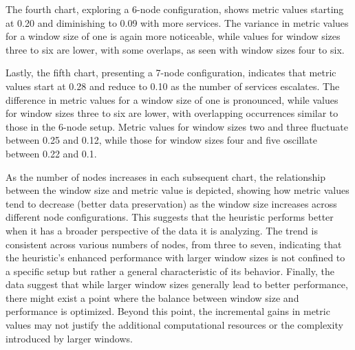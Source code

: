 The fourth chart, exploring a 6-node configuration, shows metric values starting at 0.20 and diminishing to 0.09 with more services. The variance in metric values for a window size of one is again more noticeable, while values for window sizes three to six are lower, with some overlaps, as seen with window sizes four to six.

Lastly, the fifth chart, presenting a 7-node configuration, indicates that metric values start at 0.28 and reduce to 0.10 as the number of services escalates. The difference in metric values for a window size of one is pronounced, while values for window sizes three to six are lower, with overlapping occurrences similar to those in the 6-node setup. Metric values for window sizes two and three fluctuate between 0.25 and 0.12, while those for window sizes four and five oscillate between 0.22 and 0.1.


As the number of nodes increases in each subsequent chart, the relationship between the window size and metric value is depicted,
showing how metric values tend to decrease (better data preservation) as the window size increases across different node configurations.
This suggests that the heuristic performs better when it has a broader perspective of the data it is analyzing.
The trend is consistent across various numbers of nodes, from three to seven, indicating that the heuristic's enhanced
performance with larger window sizes is not confined to a specific setup but rather a general characteristic of its behavior.
Finally, the data suggest that while larger window sizes generally lead to better performance,
there might exist a point where the balance between window size and performance is optimized.
Beyond this point, the incremental gains in metric values may not justify the additional computational resources or the complexity introduced by larger windows.


